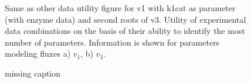 \documentclass[10pt]{article}
\begin{document}
	\begin{figure}[!tbhp]
		\caption{Same as other data utility figure for v1 with k1cat as parameter (with enzyme data) and second roots of v3. Utility of experimental data combinations on the basis of their ability to identify the most number of parameters. Information is shown for parameters modeling fluxes a) $v_1$, b) $v_3$.}\label{fig:figure4s}
	\end{figure}		

	\begin{figure}[!tbhp]
		\caption{missing caption}%
	\end{figure}	
	
\end{document}
